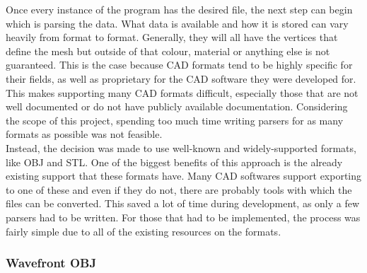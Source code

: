 Once every instance of the program has the desired file, the next step can begin which is parsing the data. What data is available and how it is stored can vary heavily from format to format. Generally, they will all have the vertices that define the mesh but outside of that colour, material or anything else is not guaranteed. This is the case because \acs{CAD} formats tend to be highly specific for their fields, as well as proprietary for the \acs{CAD} software they were developed for. This makes supporting many \acs{CAD} formats difficult, especially those that are not well documented or do not have publicly available documentation. Considering the scope of this project, spending too much time writing parsers for as many formats as possible was not feasible.\\
Instead, the decision was made to use well-known and widely-supported formats, like OBJ and STL. One of the biggest benefits of this approach is the already existing support that these formats have. Many \acs{CAD} softwares support exporting to one of these and even if they do not, there are probably tools with which the files can be converted. This saved a lot of time during development, as only a few parsers had to be written. For those that had to be implemented, the process was fairly simple due to all of the existing resources on the formats.

\subsubsection{Wavefront OBJ}

